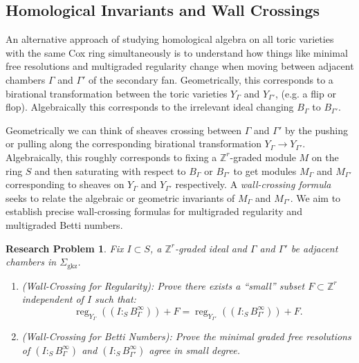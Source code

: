\documentclass[11pt,reqno]{amsart}
\newtheorem{problem}[lemma]{Research Problem}
\theoremstyle{remark}
\newcommand{\reg}{\operatorname{reg}}
\newcommand{\GKZ}{\operatorname{gkz}}
\newcommand{\ZZ}{\mathbb{Z}}
\begin{document}
 \subsection{Homological Invariants and Wall Crossings}

An alternative approach of studying homological algebra on all toric varieties with the same Cox ring simultaneously is to understand how things like minimal free resolutions and multigraded regularity change when moving between adjacent chambers $\Gamma$ and $\Gamma'$ of the secondary fan. Geometrically, this corresponds to a birational transformation between the toric varieties $Y_{\Gamma}$ and $Y_{\Gamma'}$, (e.g. a flip or flop). Algebraically this corresponds to the irrelevant ideal changing $B_{\Gamma}$ to $B_{\Gamma'}$. 

Geometrically we can think of sheaves crossing between $\Gamma$ and $\Gamma'$ by the pushing or pulling along the corresponding birational transformation $Y_{\Gamma} \to  Y_{\Gamma'}$. Algebraically, this roughly corresponds to fixing a $\ZZ^r$-graded module $M$ on the ring $S$ and then saturating with respect to $B_{\Gamma}$ or $B_{\Gamma'}$ to get modules $M_{\Gamma}$ and $M_{\Gamma'}$ corresponding to sheaves on $Y_{\Gamma}$ and  $Y_{\Gamma'}$ respectively. A \emph{wall-crossing formula} seeks to relate the algebraic or geometric invariants of $M_{\Gamma}$ and $M_{\Gamma'}$. We aim to establish precise wall-crossing formulas for multigraded regularity and multigraded Betti numbers. 

 \begin{problem}\label{prob:wall-crossing-reg}
 	Fix $I \subset S$, a $\ZZ^r$-graded ideal and $\Gamma$ and $\Gamma'$ be adjacent chambers in $\Sigma_{\GKZ}$. 
	\begin{enumerate}
	\item (Wall-Crossing for Regularity): Prove there exists a ``small'' subset $F \subset \ZZ^r$ independent of $I$ such that:
	\[
	\reg_{Y_{\Gamma}}\left((I :_{S} B_{\Gamma}^{\infty})\right)+F =\reg_{Y_{\Gamma'}}\left((I :_{S} B_{\Gamma'}^{\infty})\right)+F.
	\]
	\item (Wall-Crossing for Betti Numbers):  Prove the minimal graded free resolutions of $(I :_{S} B_{\Gamma}^{\infty})$ and $(I :_{S} B_{\Gamma'}^{\infty})$ agree in small degree.
	\end{enumerate}
 \end{problem}

\end{document}
